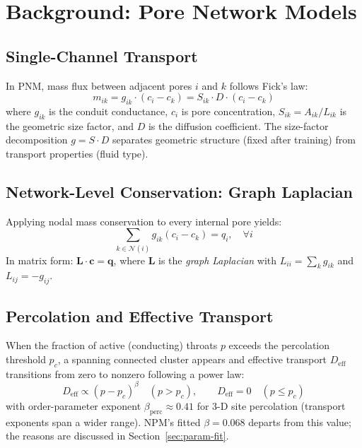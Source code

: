 \documentclass[11pt,a4paper]{article}
\newcommand{\Deff}{D_{\text{eff}}}
\begin{document}
\section{Background: Pore Network Models}

\subsection{Single-Channel Transport}

In PNM, mass flux between adjacent pores $i$ and $k$ follows Fick's law:
\begin{equation}
  m_{ik} = g_{ik} \cdot (c_i - c_k) = S_{ik} \cdot D \cdot (c_i - c_k)
  \label{eq:fick}
\end{equation}
where $g_{ik}$ is the conduit conductance, $c_i$ is pore concentration,
$S_{ik} = A_{ik}/L_{ik}$ is the geometric size factor, and $D$ is the
diffusion coefficient. The size-factor decomposition $g = S \cdot D$ separates
geometric structure (fixed after training) from transport properties (fluid type).

\subsection{Network-Level Conservation: Graph Laplacian}

Applying nodal mass conservation to every internal pore yields:
\begin{equation}
  \sum_{k \in \mathcal{N}(i)} g_{ik}(c_i - c_k) = q_i, \quad
  \forall i
  \label{eq:conservation}
\end{equation}
In matrix form: $\mathbf{L} \cdot \mathbf{c} = \mathbf{q}$, where
$\mathbf{L}$ is the \emph{graph Laplacian} with $L_{ii} = \sum_k g_{ik}$
and $L_{ij} = -g_{ij}$.

\subsection{Percolation and Effective Transport}

When the fraction of active (conducting) throats $p$ exceeds the percolation
threshold $p_c$, a spanning connected cluster appears and effective
transport $\Deff$ transitions from zero to nonzero following a power law:
\begin{equation}
  \Deff \propto (p - p_c)^\beta \quad (p > p_c), \qquad \Deff = 0 \quad (p \le p_c)
  \label{eq:percolation}
\end{equation}
with order-parameter exponent $\beta_{\text{perc}} \approx 0.41$ for 3-D site percolation (transport exponents span a wider range). NPM's fitted $\beta = 0.068$ departs from this value; the reasons are discussed in Section~\ref{sec:param-fit}.
\end{document}
